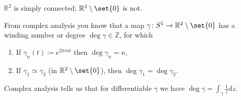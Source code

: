$\mathbb{R}^2$ is simply connected; $\mathbb{R}^2\setminus\set{0}$ is not.

From complex analysis you know that a map $\gamma\colon S^1\to \mathbb{R}^2\setminus\set{0}$ has
a winding number or degree $\deg\gamma \in \mathbb{Z}$, for which
\begin{enumerate}[label=(\roman*)]
	\item If $\gamma_n(t)\coloneqq e^{2\pi int}$ then $\deg\gamma_n = n$,
	\item If $\gamma_1\simeq\gamma_2$ (in $\mathbb{R}^2\setminus\set{0}$), then $\deg\gamma_1 = \deg\gamma_2$.
\end{enumerate}

Complex analysis tells us that for differentiable $\gamma$ we have $\deg\gamma = \int_\gamma\frac{1}{z}\mathrm{d}z$.
